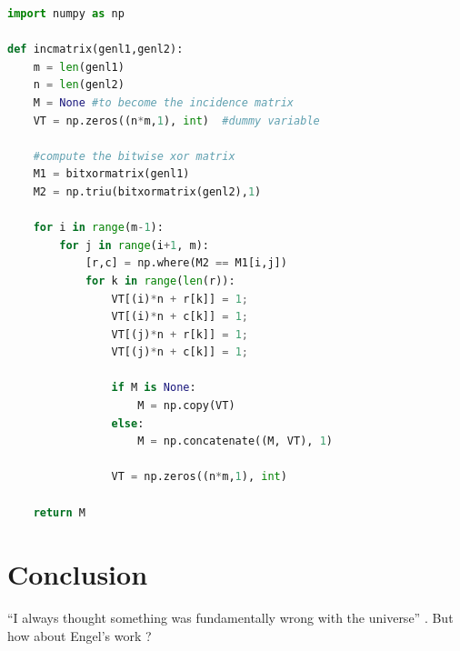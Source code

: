 \documentclass{article}
\begin{document}
\begin{lstlisting}[language=Python, caption=Python example]
import numpy as np
    
def incmatrix(genl1,genl2):
    m = len(genl1)
    n = len(genl2)
    M = None #to become the incidence matrix
    VT = np.zeros((n*m,1), int)  #dummy variable
    
    #compute the bitwise xor matrix
    M1 = bitxormatrix(genl1)
    M2 = np.triu(bitxormatrix(genl2),1) 

    for i in range(m-1):
        for j in range(i+1, m):
            [r,c] = np.where(M2 == M1[i,j])
            for k in range(len(r)):
                VT[(i)*n + r[k]] = 1;
                VT[(i)*n + c[k]] = 1;
                VT[(j)*n + r[k]] = 1;
                VT[(j)*n + c[k]] = 1;
                
                if M is None:
                    M = np.copy(VT)
                else:
                    M = np.concatenate((M, VT), 1)
                
                VT = np.zeros((n*m,1), int)
    
    return M
\end{lstlisting}

\section{Conclusion}
``I always thought something was fundamentally wrong with the universe'' \citep{adams1995hitchhiker}. But how about Engel's work \cite{Engel2020DDSP}?



\end{document}
